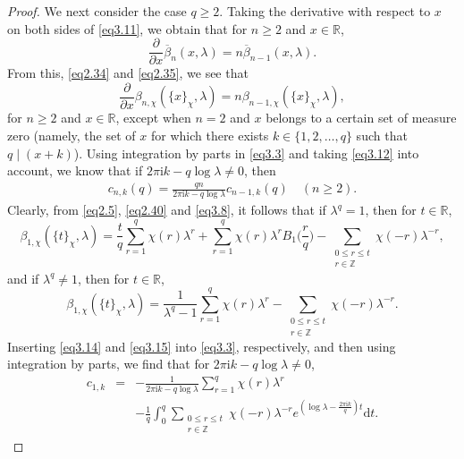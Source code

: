\documentclass[10pt,a4paper]{amsart}
\begin{document}
\begin{proof}
We next consider the case $q\geqslant2$. Taking the derivative with respect to $x$ on both sides of \eqref{eq3.11}, we obtain that for $n\geqslant2$ and $x\in\mathbb{R}$,
\begin{equation*}
\frac{\partial}{\partial x}\overline{\beta}_{n}(x,\lambda)=n\overline{\beta}_{n-1}(x,\lambda).
\end{equation*}
From this, \eqref{eq2.34} and \eqref{eq2.35}, we see that
\begin{equation}\label{eq3.12}
\frac{\partial}{\partial x}\beta_{n,\chi}(\{x\}_{\chi},\lambda)=n\beta_{n-1,\chi}(\{x\}_{\chi},\lambda),
\end{equation}
for $n\geqslant2$ and $x\in\mathbb{R}$, except when $n=2$ and $x$ belongs to a certain set of measure zero (namely, the set of $x$ for which there exists $k\in\{1,2,\ldots,q\}$ such that $q\mid(x+k)$). Using integration by parts in \eqref{eq3.3} and taking \eqref{eq3.12} into account, we know that if $2\pi\mathrm{i}k-q\log\lambda\neq0$, then
\begin{eqnarray}\label{eq3.13}
c_{n,k}(q)=\frac{qn}{2\pi\mathrm{i}k-q\log\lambda}c_{n-1,k}(q)\quad(n\geqslant2).
\end{eqnarray}
Clearly, from \eqref{eq2.5}, \eqref{eq2.40} and \eqref{eq3.8}, it follows that if $\lambda^{q}=1$, then for $t\in\mathbb{R}$,
\begin{equation}\label{eq3.14}
\beta_{1,\chi}(\{t\}_{\chi},\lambda)=\frac{t}{q}\sum_{r=1}^{q}\chi(r)\lambda^{r}+\sum_{r=1}^{q}\chi(r)\lambda^{r}B_{1}\biggl(\frac{r}{q}\biggl)-\underset{\substack{0\leqslant r\leqslant t\\ r\in\mathbb{Z}}}{\sum}\chi(-r)\lambda^{-r},
\end{equation}
and if $\lambda^{q}\neq1$, then for $t\in\mathbb{R}$,
\begin{equation}\label{eq3.15}
\beta_{1,\chi}(\{t\}_{\chi},\lambda)=\frac{1}{\lambda^{q}-1}\sum_{r=1}^{q}\chi(r)\lambda^{r}-\underset{\substack{0\leqslant r\leqslant t\\ r\in\mathbb{Z}}}{\sum}\chi(-r)\lambda^{-r}.
\end{equation}
Inserting \eqref{eq3.14} and \eqref{eq3.15} into \eqref{eq3.3}, respectively, and then using integration by parts, we find that for $2\pi\mathrm{i}k-q\log\lambda\neq0$,
\begin{eqnarray}\label{eq3.16}
c_{1,k}&=&-\frac{1}{2\pi\mathrm{i}k-q\log\lambda}\sum_{r=1}^{q}\chi(r)\lambda^{r}\nonumber\\
&&-\frac{1}{q}\int_{0}^{q}\underset{\substack{0\leqslant r\leqslant t\\ r\in\mathbb{Z}}}{\sum}\chi(-r)\lambda^{-r}e^{(\log\lambda-\frac{2\pi\mathrm{i}k}{q})t}\text{d}t.

\end{eqnarray}
\end{proof}
\end{document}
